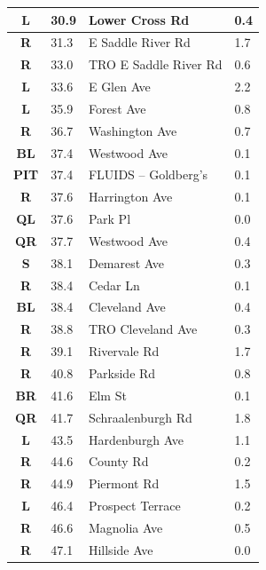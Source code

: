 \documentclass[11pt]{article}
\begin{document}
\begin{center}
\begin{supertabular}{|c|p{0.30in}|p{2.25in}|l|}
 \textbf{L} &  30.9 & Lower Cross Rd &   0.4 \\ \hline
{} \textbf{R} &  31.3 & E Saddle River Rd &   1.7 \\ \hline
{} \textbf{R} &  33.0 & TRO E Saddle River Rd &   0.6 \\ \hline
 \textbf{L} &  33.6 & E Glen Ave &   2.2 \\ \hline
 \textbf{L} &  35.9 & Forest Ave &   0.8 \\ \hline
{} \textbf{R} &  36.7 & Washington Ave &   0.7 \\ \hline
 \textbf{BL} &  37.4 & Westwood Ave &   0.1 \\ \hline
{} \textbf{PIT} &  37.4 & FLUIDS -- Goldberg's &   0.1 \\ \hline
{} \textbf{R} &  37.6 & Harrington Ave &   0.1 \\ \hline
 \textbf{QL} &  37.6 & Park Pl &   0.0 \\ \hline
{} \textbf{QR} &  37.7 & Westwood Ave &   0.4 \\ \hline
 \textbf{S} &  38.1 & Demarest Ave &   0.3 \\ \hline
{} \textbf{R} &  38.4 & Cedar Ln &   0.1 \\ \hline
 \textbf{BL} &  38.4 & Cleveland Ave &   0.4 \\ \hline
{} \textbf{R} &  38.8 & TRO Cleveland Ave &   0.3 \\ \hline
{} \textbf{R} &  39.1 & Rivervale Rd &   1.7 \\ \hline
{} \textbf{R} &  40.8 & Parkside Rd &   0.8 \\ \hline
{} \textbf{BR} &  41.6 & Elm St &   0.1 \\ \hline
{} \textbf{QR} &  41.7 & Schraalenburgh Rd &   1.8 \\ \hline
 \textbf{L} &  43.5 & Hardenburgh Ave &   1.1 \\ \hline
{} \textbf{R} &  44.6 & County Rd &   0.2 \\ \hline
{} \textbf{R} &  44.9 & Piermont Rd &   1.5 \\ \hline
 \textbf{L} &  46.4 & Prospect Terrace &   0.2 \\ \hline
{} \textbf{R} &  46.6 & Magnolia Ave &   0.5 \\ \hline
{} \textbf{R} &  47.1 & Hillside Ave &   0.0 \\ \hline

\end{supertabular}
\end{center}
\end{document}
